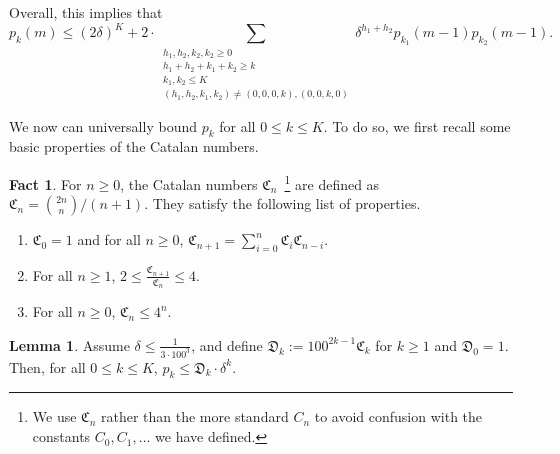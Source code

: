 \documentclass[12pt]{article}
\theoremstyle{definition}
\newtheorem{fact}[theorem]{Fact}
\newtheorem{lemma}[theorem]{Lemma}
\theoremstyle{remark}
\newcommand{\ten}{100}
\newcommand{\fC}{\mathfrak{C}}
\newcommand{\fD}{\mathfrak{D}}
\begin{document}
Overall, this implies that 
\[p_k(m) \le (2\delta)^{K} + 2 \cdot \sum_{\substack{h_1, h_2, k_2, k_2 \ge 0 \\ h_1+h_2+k_1+k_2 \ge k \\ k_1, k_2 \le K \\ (h_1, h_2, k_1, k_2) \neq (0, 0, 0, k), (0, 0, k, 0)}} \delta^{h_1+h_2} p_{k_1}(m-1) p_{k_2}(m-1).\]

We now can universally bound $p_k$ for all $0 \le k \le K$. To do so, we first recall some basic properties of the Catalan numbers.

\begin{fact} \label{fact:catalan}
    For $n \ge 0$, the Catalan numbers $\fC_n$~\footnote{We use $\fC_n$ rather than the more standard $C_n$ to avoid confusion with the constants $C_0, C_1, \dots$ we have defined.} are defined as $\fC_n = {2n \choose n}/(n+1)$. They satisfy the following list of properties.
\begin{enumerate}
    \item $\fC_0 = 1$ and for all $n \ge 0$, $\fC_{n+1} = \sum_{i=0}^n \fC_i \fC_{n-i}$.
    \item For all $n \ge 1$, $2 \le \frac{\fC_{n+1}}{\fC_n} \le 4$.
    \item For all $n \ge 0$, $\fC_n \le 4^n$.
\end{enumerate}
\end{fact}

\begin{lemma} \label{lem:computation}
    Assume $\delta \le \frac{1}{3 \cdot \ten^3}$, and define $\fD_k := 100^{2k-1} \fC_k$ for $k \ge 1$ and $\fD_0 = 1$. Then, for all $0 \le k \le K$, $p_k \le \fD_k \cdot \delta^k$.
\end{lemma}
\end{document}
